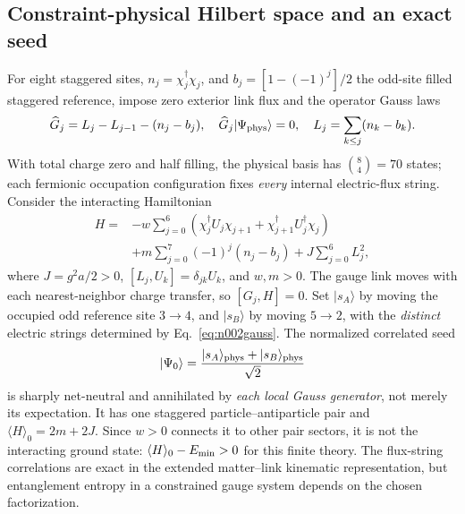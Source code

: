 \documentclass[11pt,a4paper]{article}
\theoremstyle{tmon}
\theoremstyle{definition}
\begin{document}
\subsection{Constraint-physical Hilbert space and an exact seed}
For eight staggered sites, $n_j=\chi_j^\dagger\chi_j$, and $b_j=[1-(-1)^j]/2$ the odd-site filled staggered reference, impose zero exterior link flux and the operator Gauss laws
\begin{equation}
\widehat G_j=L_j-L_{j-1}-(n_j-b_j),\quad
\widehat G_j|\Psi_{\rm phys}\rangle=0,\quad
L_j=\sum_{k\le j}(n_k-b_k).
\label{eq:n002gauss}
\end{equation}
With total charge zero and half filling, the physical basis has $\binom84=70$ states; each fermionic occupation configuration fixes \emph{every} internal electric-flux string. Consider the interacting Hamiltonian
\begin{equation}
\begin{aligned}
H={}&-w\sum_{j=0}^{6}(\chi_j^\dagger U_j\chi_{j+1}+\chi_{j+1}^\dagger U_j^\dagger\chi_j)\\
&+m\sum_{j=0}^{7}(-1)^j(n_j-b_j)+J\sum_{j=0}^{6}L_j^2,
\end{aligned}\label{eq:n002ham}
\end{equation}
where $J=g^2a/2>0$, $[L_j,U_k]=\delta_{jk}U_k$, and $w,m>0$. The gauge link moves with each nearest-neighbor charge transfer, so $[G_j,H]=0$. Set $|s_A\rangle$ by moving the occupied odd reference site $3\to4$, and $|s_B\rangle$ by moving $5\to2$, with the \emph{distinct} electric strings determined by Eq.~\eqref{eq:n002gauss}. The normalized correlated seed
\begin{equation}
|\Psi_0\rangle=\frac{|s_A\rangle_{\rm phys}+|s_B\rangle_{\rm phys}}{\sqrt2}
\label{eq:n002seed}
\end{equation}
is sharply net-neutral and annihilated by \emph{each local Gauss generator}, not merely its expectation. It has one staggered particle--antiparticle pair and $\langle H\rangle_0=2m+2J$. Since $w>0$ connects it to other pair sectors, it is not the interacting ground state: $\langle H\rangle_0-E_{\rm min}>0$ for this finite theory. The flux-string correlations are exact in the extended matter--link kinematic representation, but entanglement entropy in a constrained gauge system depends on the chosen factorization.
\end{document}
